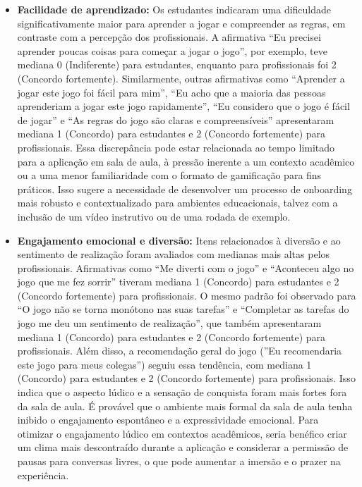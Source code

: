 \documentclass[
	12pt,
	openright,
	twoside,
	a4paper,
	english,
	brazil
	]{abntex2}
\begin{document}
\begin{itemize}
  \item \textbf{Facilidade de aprendizado:} Os estudantes indicaram uma dificuldade significativamente maior para aprender a jogar e compreender as regras, em contraste com a percepção dos profissionais. A afirmativa “Eu precisei aprender poucas coisas para começar a jogar o jogo”, por exemplo, teve mediana 0 (Indiferente) para estudantes, enquanto para profissionais foi 2 (Concordo fortemente). Similarmente, outras afirmativas como “Aprender a jogar este jogo foi fácil para mim”, “Eu acho que a maioria das pessoas aprenderiam a jogar este jogo rapidamente”, “Eu considero que o jogo é fácil de jogar” e “As regras do jogo são claras e compreensíveis” apresentaram mediana 1 (Concordo) para estudantes e 2 (Concordo fortemente) para profissionais. Essa discrepância pode estar relacionada ao tempo limitado para a aplicação em sala de aula, à pressão inerente a um contexto acadêmico ou a uma menor familiaridade com o formato de gamificação para fins práticos. Isso sugere a necessidade de desenvolver um processo de onboarding mais robusto e contextualizado para ambientes educacionais, talvez com a inclusão de um vídeo instrutivo ou de uma rodada de exemplo.

  \item \textbf{Engajamento emocional e diversão:} Itens relacionados à diversão e ao sentimento de realização foram avaliados com medianas mais altas pelos profissionais. Afirmativas como “Me diverti com o jogo” e “Aconteceu algo no jogo que me fez sorrir” tiveram mediana 1 (Concordo) para estudantes e 2 (Concordo fortemente) para profissionais. O mesmo padrão foi observado para “O jogo não se torna monótono nas suas tarefas” e “Completar as tarefas do jogo me deu um sentimento de realização”, que também apresentaram mediana 1 (Concordo) para estudantes e 2 (Concordo fortemente) para profissionais. Além disso, a recomendação geral do jogo (”Eu recomendaria este jogo para meus colegas”) seguiu essa tendência, com mediana 1 (Concordo) para estudantes e 2 (Concordo fortemente) para profissionais. Isso indica que o aspecto lúdico e a sensação de conquista foram mais fortes fora da sala de aula. É provável que o ambiente mais formal da sala de aula tenha inibido o engajamento espontâneo e a expressividade emocional. Para otimizar o engajamento lúdico em contextos acadêmicos, seria benéfico criar um clima mais descontraído durante a aplicação e considerar a permissão de pausas para conversas livres, o que pode aumentar a imersão e o prazer na experiência.
\end{itemize}
\end{document}
